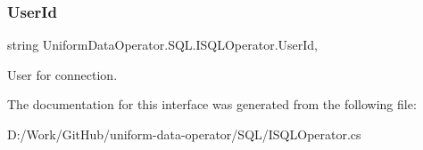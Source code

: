 \subsubsection{\texorpdfstring{User\+Id}{UserId}}
{\footnotesize\ttfamily string Uniform\+Data\+Operator.\+S\+Q\+L.\+I\+S\+Q\+L\+Operator.\+User\+Id\hspace{0.3cm}{\ttfamily [get]}, {\ttfamily [set]}}



User for connection. 



The documentation for this interface was generated from the following file\+:\begin{DoxyCompactItemize}
\item 
D\+:/\+Work/\+Git\+Hub/uniform-\/data-\/operator/\+S\+Q\+L/I\+S\+Q\+L\+Operator.\+cs\end{DoxyCompactItemize}

